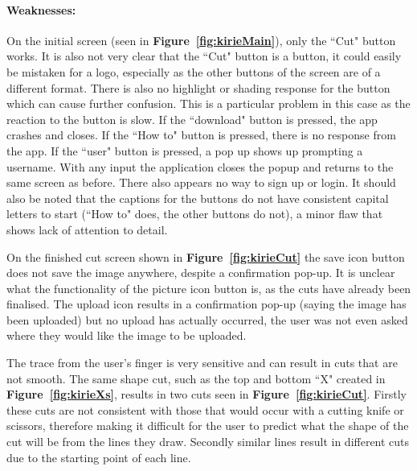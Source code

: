 \documentclass[11pt]{article}
\begin{document}
                
                \paragraph{Weaknesses:}
                On the initial screen (seen in \textbf{Figure~\ref{fig:kirieMain}}), only the ``Cut" button works. It is also not very clear that the ``Cut" button is a button, it could easily be  mistaken for a logo, especially as the other buttons of the screen are of a different format. There is also no highlight or shading response for the button which can cause further confusion. This is a particular problem in this case as the reaction to the button is slow. If the ``download" button is pressed, the app crashes and closes. If the ``How to" button is pressed, there is no response from the app. If the ``user" button is pressed, a pop up shows up prompting a username. With any input the application closes the popup and returns to the same screen as before. There also appears no way to sign up or login. It should also be noted that the captions for the buttons do not have consistent capital letters to start (``How to" does, the other buttons do not), a minor flaw that shows lack of attention to detail.
                
                On the finished cut screen shown in \textbf{Figure~\ref{fig:kirieCut}} the save icon button does not save the image anywhere, despite a confirmation pop-up. It is unclear what the functionality of the picture icon button is, as the cuts have already been finalised. The upload icon results in a confirmation pop-up (saying the image has been uploaded) but no upload has actually occurred, the user was not even asked where they would like the image to be uploaded. 
                
                The trace from the user's finger is very sensitive and can result in cuts that are not smooth. The same shape cut, such as the top and bottom ``X" created in \textbf{Figure~\ref{fig:kirieXs}}, results in two cuts seen in \textbf{Figure~\ref{fig:kirieCut}}. Firstly these cuts are not consistent with those that would occur with a cutting knife or scissors, therefore making it difficult for the user to predict what the shape of the cut will be from the lines they draw. Secondly similar lines result in different cuts due to the starting point of each line.
                
\end{document}
